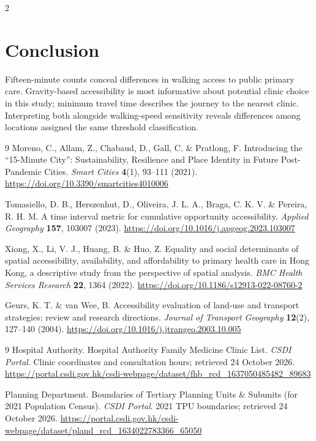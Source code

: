 \documentclass[10pt,a4paper]{article}
\begin{document}
\begin{multicols}{2}
\section*{Conclusion}
Fifteen-minute counts conceal differences in walking access to public primary care. Gravity-based accessibility is most informative about potential clinic choice in this study; minimum travel time describes the journey to the nearest clinic. Interpreting both alongside walking-speed sensitivity reveals differences among locations assigned the same threshold classification.
\small
\begin{thebibliography}{9}
Moreno, C., Allam, Z., Chabaud, D., Gall, C. \& Pratlong, F. Introducing the ``15-Minute City'': Sustainability, Resilience and Place Identity in Future Post-Pandemic Cities. \textit{Smart Cities} \textbf{4}(1), 93--111 (2021). \url{https://doi.org/10.3390/smartcities4010006}

Tomasiello, D. B., Herszenhut, D., Oliveira, J. L. A., Braga, C. K. V. \& Pereira, R. H. M. A time interval metric for cumulative opportunity accessibility. \textit{Applied Geography} \textbf{157}, 103007 (2023). \url{https://doi.org/10.1016/j.apgeog.2023.103007}

Xiong, X., Li, V. J., Huang, B. \& Huo, Z. Equality and social determinants of spatial accessibility, availability, and affordability to primary health care in Hong Kong, a descriptive study from the perspective of spatial analysis. \textit{BMC Health Services Research} \textbf{22}, 1364 (2022). \url{https://doi.org/10.1186/s12913-022-08760-2}

Geurs, K. T. \& van Wee, B. Accessibility evaluation of land-use and transport strategies: review and research directions. \textit{Journal of Transport Geography} \textbf{12}(2), 127--140 (2004). \url{https://doi.org/10.1016/j.jtrangeo.2003.10.005}
\end{thebibliography}

\begingroup
\renewcommand{\refname}{Official data sources}
\begin{thebibliography}{9}
\setcounter{enumiv}{4}
Hospital Authority. Hospital Authority Family Medicine Clinic List. \textit{CSDI Portal}. Clinic coordinates and consultation hours; retrieved 24 October 2026. \url{https://portal.csdi.gov.hk/csdi-webpage/dataset/fhb_rcd_1637050485482_89683}

Planning Department. Boundaries of Tertiary Planning Units \& Subunits (for 2021 Population Census). \textit{CSDI Portal}. 2021 TPU boundaries; retrieved 24 October 2026. \url{https://portal.csdi.gov.hk/csdi-webpage/dataset/pland_rcd_1634022783366_65050}


\end{thebibliography}
\end{multicols}
\end{document}
